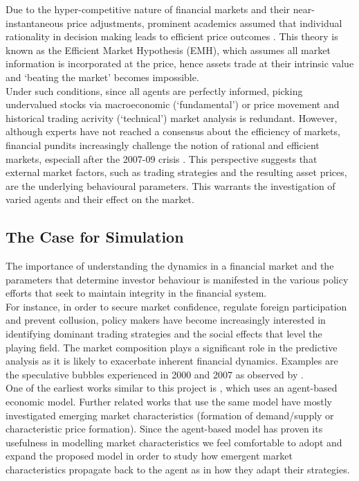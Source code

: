 \documentclass[11pt]{article}
\begin{document}
Due to the hyper-competitive nature of financial markets and their near-instantaneous price adjustments, prominent academics assumed that individual rationality in decision making leads to efficient price outcomes \citep{zeckhauser1991nonrational}. This theory is known as the Efficient Market Hypothesis (EMH), which assumes all market information is incorporated at the price, hence assets trade at their intrinsic value and `beating the market' becomes impossible. \\
Under such conditions, since all agents are perfectly informed, picking undervalued stocks via macroeconomic (`fundamental') or price movement and historical trading acrivity (`technical') market analysis is redundant. However, although experts have not reached a consensus about the efficiency of markets, financial pundits increasingly challenge the notion of rational and efficient markets, especiall after the 2007-09 crisis \citep{fox2011myth}. This perspective suggests that external market factors, such as trading strategies and the resulting asset prices, are the underlying behavioural parameters. This warrants the investigation of varied agents and their effect on the market. \\

\subsection{The Case for Simulation}
The importance of understanding the dynamics in a financial market and the parameters that determine investor behaviour is manifested in the various policy efforts that seek to maintain integrity in the financial system.\\
For instance, in order to secure market confidence, regulate foreign participation and prevent collusion, policy makers have become increasingly interested in identifying dominant trading strategies and the social effects that level the playing field. The market composition plays a significant role in the predictive analysis as it is likely to exacerbate inherent financial dynamics. Examples are the speculative bubbles experienced in 2000 and 2007 as observed by \citet{kaizoji2015super}. \\
One of the earliest works similar to this project is \citet{de1990noise}, which uses an agent-based economic model. Further related works that use the same model have mostly investigated emerging market characteristics (formation of demand/supply or characteristic price formation). Since the agent-based model has proven its usefulness in modelling market characteristics we feel comfortable to adopt and expand the proposed model in order to study how emergent market characteristics propagate back to the agent as in how they adapt their strategies.
\end{document}
